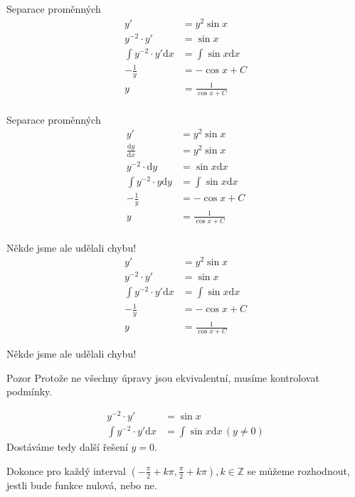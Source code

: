 \documentclass{beamer}
\theoremstyle{definition}
\theoremstyle{example}
\def\Z{\mathbb{Z}}
\def\d{\mathrm{d}}
\begin{document}
\begin{frame}{Separace proměnných}
	\begin{align*}
		y' &= y^2 \sin x\\
		y^{-2}\cdot y' &= \sin x\\
		\int y^{-2} \cdot y' \d x &= \int \sin x \d x\\
		-\frac{1}{y} &= -\cos x + C\\
		y &= \frac{1}{\cos x + C}\\ 
	\end{align*}
\end{frame}

\begin{frame}{Separace proměnných}
	\begin{align*}
		y' &= y^2 \sin x\\
		\frac{\d y}{\d x} &= y^2 \sin x\\
		y^{-2}\cdot \d y &= \sin x \d x\\
		\int y^{-2} \cdot y \d y &= \int \sin x \d x\\
		-\frac{1}{y} &= -\cos x + C\\
		y &= \frac{1}{\cos x + C}\\ 
	\end{align*}
\end{frame}

\begin{frame}{Někde jsme ale udělali chybu!}
	\begin{align*}
		y' &= y^2 \sin x\\
		y^{-2}\cdot y' &= \sin x\\
		\int y^{-2} \cdot y' \d x &= \int \sin x \d x\\
		-\frac{1}{y} &= -\cos x + C\\
		y &= \frac{1}{\cos x + C}
	\end{align*}
\end{frame}

\begin{frame}{Někde jsme ale udělali chybu!}
	\begin{alertblock}{Pozor}
		Protože ne všechny úpravy jsou ekvivalentní, musíme kontrolovat podmínky.
	\end{alertblock}
	\begin{align*}
		y^{-2}\cdot y' &= \sin x\\
		\int y^{-2} \cdot y' \d x &= \int \sin x \d x \, (y \neq 0)
	\end{align*}
	Dostáváme tedy další řešení $y = 0$.

	Dokonce pro každý interval $(-\frac{\pi}{2} + k\pi, \frac{\pi}{2} + k\pi), k \in \Z$ se můžeme rozhodnout, jestli bude funkce nulová, nebo ne.
\end{frame}
\end{document}
